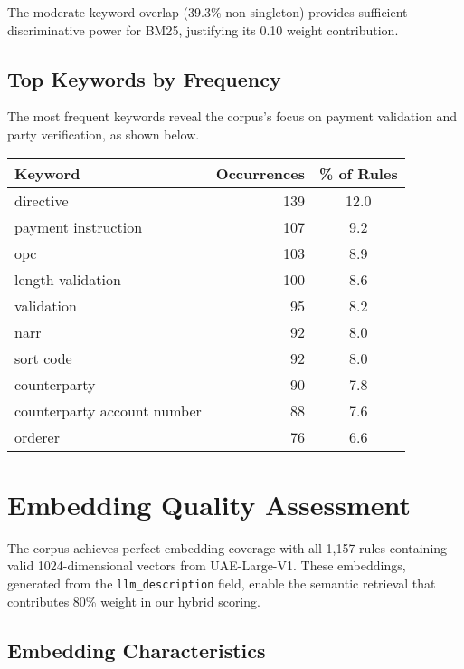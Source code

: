 The moderate keyword overlap (39.3\% non-singleton) provides sufficient discriminative power for BM25, justifying its 0.10 weight contribution.

\subsection{Top Keywords by Frequency}

The most frequent keywords reveal the corpus's focus on payment validation and party verification, as shown below.

\vspace{0.5em}
\noindent
\begin{minipage}{\textwidth}
\centering
\begin{tabular}{lrc}
\toprule
\textbf{Keyword} & \textbf{Occurrences} & \textbf{\% of Rules} \\
\midrule
directive & 139 & 12.0 \\
payment instruction & 107 & 9.2 \\
opc & 103 & 8.9 \\
length validation & 100 & 8.6 \\
validation & 95 & 8.2 \\
narr & 92 & 8.0 \\
sort code & 92 & 8.0 \\
counterparty & 90 & 7.8 \\
counterparty account number & 88 & 7.6 \\
orderer & 76 & 6.6 \\
\bottomrule
\end{tabular}
\label{tab:top-keywords}
\end{minipage}
\vspace{0.5em}

\section{Embedding Quality Assessment}

The corpus achieves perfect embedding coverage with all 1,157 rules containing valid 1024-dimensional vectors from UAE-Large-V1. These embeddings, generated from the \texttt{llm\_description} field, enable the semantic retrieval that contributes 80\% weight in our hybrid scoring.

\subsection{Embedding Characteristics}

